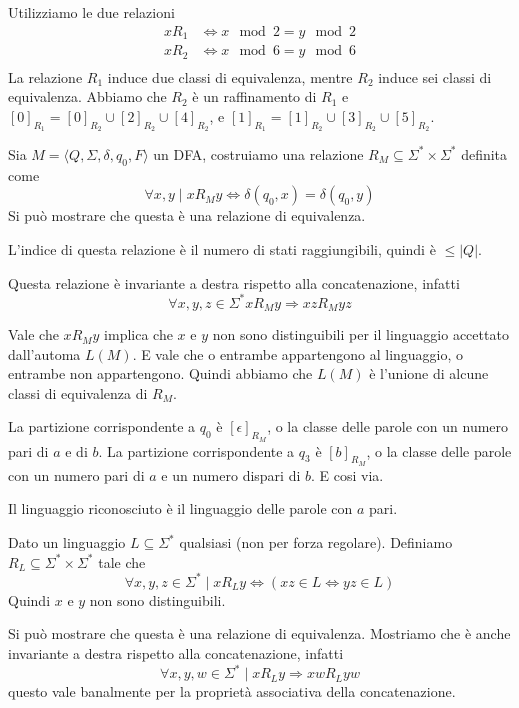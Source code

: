 \documentclass[12pt]{article}
\begin{document}
\begin{tcolorbox}
	Utilizziamo le due relazioni
	\begin{align*}
		x R_1 &\Leftrightarrow x \mod 2 = y \mod 2 \\
		x R_2 &\Leftrightarrow x \mod 6 = y \mod 6 \\
	\end{align*}
	La relazione $R_1$ induce due classi di equivalenza, mentre $R_2$ induce sei classi di equivalenza.
	Abbiamo che $R_2$ è un raffinamento di $R_1$ e $[0]_{R_1} = [0]_{R_2} \cup [2]_{R_2} \cup [4]_{R_2}$, e $[1]_{R_1} = [1]_{R_2} \cup [3]_{R_2} \cup [5]_{R_2}$.
\end{tcolorbox}

Sia $M = \langle Q, \Sigma, \delta, q_0, F \rangle$ un DFA, costruiamo una relazione $R_M \subseteq \Sigma^* \times \Sigma^*$ definita come
$$ \forall x, y \mid x R_M y \Leftrightarrow \delta(q_0, x) = \delta(q_0, y) $$
Si può mostrare che questa è una relazione di equivalenza.

L'indice di questa relazione è il numero di stati raggiungibili, quindi è $\leq |Q|$.

Questa relazione è invariante a destra rispetto alla concatenazione, infatti
$$ \forall x, y, z \in \Sigma^* x R_M y \Rightarrow xz R_M y z $$

Vale che $x R_M y$ implica che $x$ e $y$ non sono distinguibili per il linguaggio accettato dall'automa $L(M)$.
E vale che o entrambe appartengono al linguaggio, o entrambe non appartengono.
Quindi abbiamo che $L(M)$ è l'unione di alcune classi di equivalenza di $R_M$.

\begin{tcolorbox}
	La partizione corrispondente a $q_0$ è $[\epsilon]_{R_M}$, o la classe delle parole con un numero pari di $a$ e di $b$.
	La partizione corrispondente a $q_3$ è $[b]_{R_M}$, o la classe delle parole con un numero pari di $a$ e un numero dispari di $b$.
	E cosi via.

	Il linguaggio riconosciuto è il linguaggio delle parole con $a$ pari.
\end{tcolorbox}

Dato un linguaggio $L \subseteq \Sigma^*$ qualsiasi (non per forza regolare).
Definiamo $R_L \subseteq \Sigma^* \times \Sigma^*$ tale che
$$ \forall x, y, z \in \Sigma^* \mid x R_L y \Leftrightarrow (x z \in L \Leftrightarrow yz \in L) $$
Quindi $x$ e $y$ non sono distinguibili.

Si può mostrare che questa è una relazione di equivalenza.
Mostriamo che è anche invariante a destra rispetto alla concatenazione, infatti
$$ \forall x, y, w \in \Sigma^* \mid x R_L y \Rightarrow x w R_L y w $$
questo vale banalmente per la proprietà associativa della concatenazione.
\end{document}
